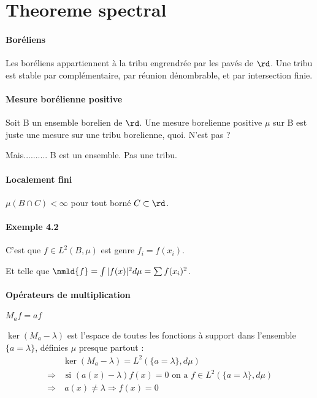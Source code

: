 
\section{Theoreme spectral}

\paragraph{Boréliens} Les boréliens appartiennent à la tribu engrendrée
par les pavés de $\rd$. Une tribu est stable par complémentaire,
par réunion dénombrable, et par intersection finie.

\paragraph{Mesure borélienne positive} Soit B un ensemble borelien
de $\rd$. Une mesure borelienne positive $\mu$ sur B est juste une
mesure sur une tribu borelienne, quoi. N'est pas ?

Mais.......... B est un ensemble. Pas une tribu.

\paragraph{Localement fini} $\mu(B \cap C) < \infty$
pour tout borné $C \subset \rd$.

\paragraph{Exemple 4.2} C'est que $f \in L^2(B, \mu)$ est genre
$f_i = f(x_i)$.

Et telle que $\nmld{f} = \int |f(x)|^2 d\mu = \sum f(x_i)^2$.

\paragraph{Opérateurs de multiplication} $M_a f = af$

$\ker(M_a - \lambda)$ est l'espace de toutes les fonctions à
support dans l'ensemble $\{a = \lambda\}$,
définies $\mu$ presque partout :
\begin{align}
    & \ker(M_a - \lambda) = L^2(\{ a = \lambda \}, d\mu) \\
    \Rightarrow & \text{ si } (a(x) - \lambda)f(x) = 0
    \text{ on a } f \in L^2(\{ a = \lambda \}, d\mu) \\
    \Rightarrow & \ a(x) \ne \lambda \Rightarrow f(x) = 0
\end{align}

